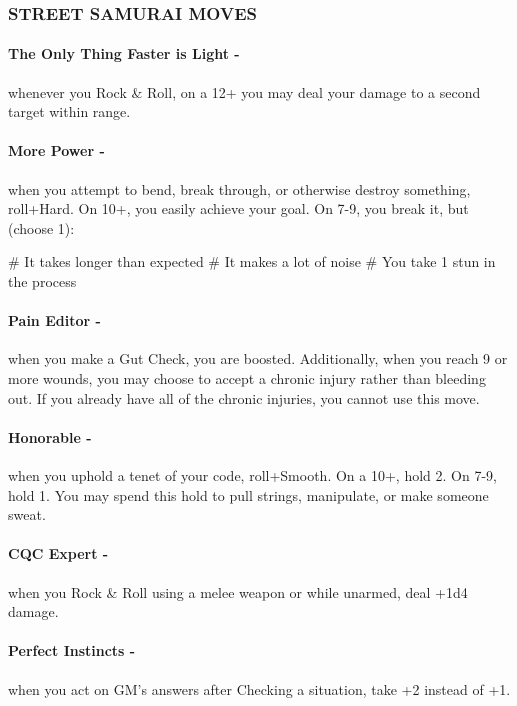 \subsubsection{STREET SAMURAI MOVES}
\paragraph{The Only Thing Faster is Light -} whenever you Rock \& Roll, on a 12+ you may deal your damage to a second target within range.

\paragraph{More Power -} when you attempt to bend, break through, or otherwise destroy something, roll+Hard. On 10+, you easily achieve your goal. On 7-9, you break it, but (choose 1):
    \begin{easylist}
        # It takes longer than expected
        # It makes a lot of noise
        # You take 1 stun in the process
    \end{easylist}

\paragraph{Pain Editor -} when you make a Gut Check, you are boosted. Additionally, when you reach 9 or more wounds, you may choose to accept a chronic injury rather than bleeding out. If you already have all of the chronic injuries, you cannot use this move.

\paragraph{Honorable -} when you uphold a tenet of your code, roll+Smooth. On a 10+, hold 2. On 7-9, hold 1. You may spend this hold to pull strings, manipulate, or make someone sweat.

\paragraph{CQC Expert -} when you Rock \& Roll using a melee weapon or while unarmed, deal +1d4 damage.

\paragraph{Perfect Instincts -} when you act on GM’s answers after Checking a situation, take +2 instead of +1.

